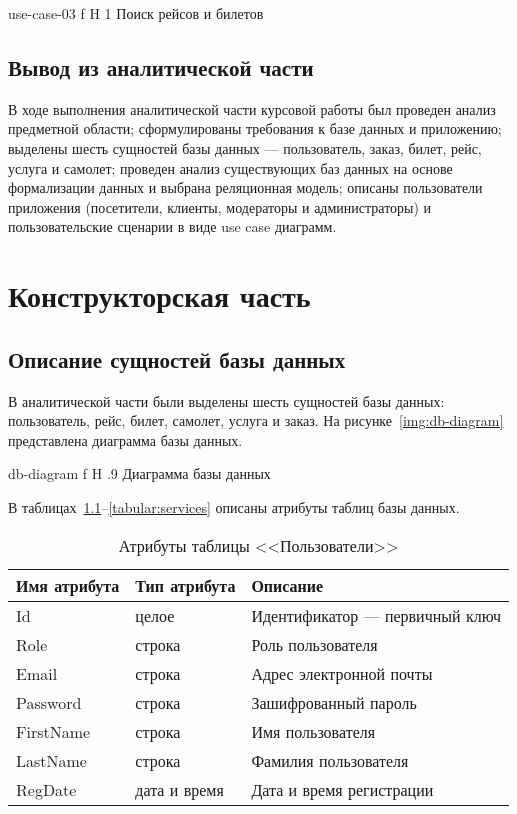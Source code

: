 \documentclass{bmstu}
\begin{document}
    {use-case-03}
    {f}
    {H}
    {1\textwidth}
    {Поиск рейсов и билетов}

\section*{Вывод из аналитической части}

В ходе выполнения аналитической части курсовой работы был проведен анализ предметной области; сформулированы требования к базе данных и приложению; выделены шесть сущностей базы данных --- пользователь, заказ, билет, рейс, услуга и самолет; проведен анализ существующих баз данных на основе формализации данных и выбрана реляционная модель; описаны пользователи приложения (посетители, клиенты, модераторы и администраторы) и пользовательские сценарии в виде use case диаграмм.

\chapter{Конструкторская часть}

\section{Описание сущностей базы данных}

В аналитической части были выделены шесть сущностей базы данных: пользователь, рейс, билет, самолет, услуга и заказ. 
На рисунке~\ref{img:db-diagram} представлена диаграмма базы данных.

    {db-diagram}
    {f}
    {H}
    {.9\textwidth}
    {Диаграмма базы данных}

В таблицах~\ref{tabular:users}--\ref{tabular:services} описаны атрибуты таблиц базы данных.

\begin{table}[H]
\caption{Атрибуты таблицы <<Пользователи>>}
\label{tabular:users}
\begin{tabular}{|>{\raggedleft}p{4cm}|>{\raggedleft}p{3cm}|>{\raggedleft}p{8cm}|}
\hline
\textbf{Имя атрибута} & \textbf{Тип атрибута} & \textbf{Описание}
\tabularnewline
\hline
Id & целое & Идентификатор --- первичный ключ
\tabularnewline
\hline
Role & строка & Роль пользователя
\tabularnewline
\hline
Email & строка & Адрес электронной почты
\tabularnewline
\hline
Password & строка & Зашифрованный пароль
\tabularnewline
\hline
FirstName & строка & Имя пользователя
\tabularnewline
\hline
LastName & строка & Фамилия пользователя
\tabularnewline
\hline
RegDate & дата и время & Дата и время регистрации
\tabularnewline
\hline
\end{tabular}
\end{table}
\end{document}
